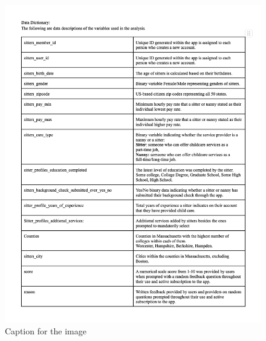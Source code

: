 \documentclass[12pt]{article}
\begin{document}
\begin{figure}
\centering
\includegraphics{IMAGES/data_dictionary.png}
\caption{Caption for the image}
\end{figure}
\end{document}
